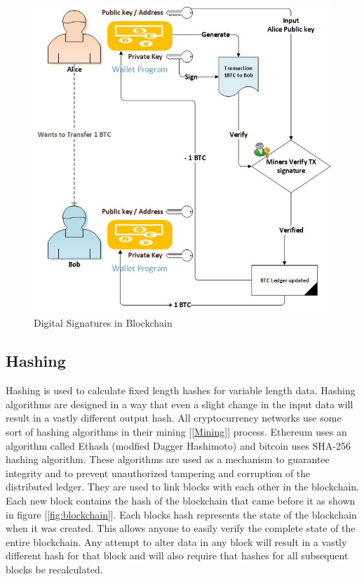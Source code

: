 \begin{figure}[h]
	\centering
    \includegraphics[width=160mm,scale=1]{figs/sig}
	\caption{Digital Signatures in Blockchain}
	\label{fig:bc-sig}
\end{figure}
\clearpage

\subsection{Hashing}
Hashing is used to calculate fixed length hashes for variable length data. Hashing algorithms are designed in a way that even a slight change in the input data will result in a vastly different output hash. All cryptocurrency networks use some sort of hashing algorithms in their mining [\ref{Mining}] process. Ethereum uses an algorithm called Ethash (modfied Dagger Hashimoto) and bitcoin uses SHA-256 \cite{dang_2015} hashing algorithm. These algorithms are used as a mechanism to guarantee integrity and to prevent unauthorized tampering and corruption of the distributed ledger. They are used to link blocks with each other in the blockchain. Each new block contains the hash of the blockchain that came before it as shown in figure [\ref{fig:blockchain}]. Each blocks hash represents the state of the blockchain when it was created. This allows anyone to easily verify the complete state of the entire blockchain. Any attempt to alter data in any block will result in a vastly different hash for that block and will also require that hashes for all subsequent blocks be recalculated.
